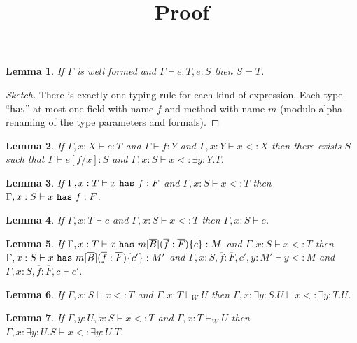\documentclass[preprint,nocopyrightspace,9pt]{sigplanconf}
\begin{document}
\title{Proof}
\authorinfo{}{}{}
\maketitle

\newtheorem{thm}{Theorem}
\newtheorem{lem}{Lemma}

\begin{lem}\label{uni}
If $\Gamma$ is well formed and $\Gamma\vdash e:T,e:S$ then $S=T$.
\end{lem}

\begin{proof}[Sketch]
There is exactly one typing rule for each kind of expression. Each type ``{\tt has}'' at most one field with name $f$ and method with name $m$ (modulo alpha-renaming of the type parameters and formals).
\end{proof}

\begin{lem}\label{sub}
If $\Gamma,x:X\vdash e:T$ and $\Gamma\vdash f:Y$ and $\Gamma,x:Y\vdash x<:X$ then there exists $S$ such that $\Gamma\vdash e[f/x]:S$ and $\Gamma,x:S\vdash x<:\exists y:Y.T$.
\end{lem}

\begin{lem}\label{suf}
If $\Gamma,x:T\vdash x~{\tt has}~f:F$ and $\Gamma,x:S\vdash x<:T$ then $\Gamma,x:S\vdash x~{\tt has}~f:F$.
\end{lem}

\begin{lem}\label{suc}
If $\Gamma,x:T\vdash c$ and $\Gamma,x:S\vdash x<:T$ then $\Gamma,x:S\vdash c$.
\end{lem}

\begin{lem}\label{sum}
If $\Gamma,x:T\vdash x~{\tt has}~m[\overline{B}](\overline{f}:\overline{F})\{c\}:M$ and $\Gamma,x:S\vdash x<:T$ then $\Gamma,x:S\vdash x~{\tt has}~m[\overline{B}](\overline{f}:\overline{F})\{c'\}:M'$ and $\Gamma,x:S,\overline{f}:\overline{F},c',y:M'\vdash y<:M$ and $\Gamma,x:S,\overline{f}:\overline{F},c\vdash c'$.
\end{lem}

\begin{lem}\label{sue}
If $\Gamma,x:S\vdash x<:T$ and $\Gamma,x:T\vdash_W U$ then $\Gamma, x:\exists y:S.U\vdash x<:\exists y:T.U$.
\end{lem}

\begin{lem}\label{sud}
If $\Gamma,y:U,x:S\vdash x<:T$ and $\Gamma,x:T\vdash_W U$ then $\Gamma, x:\exists y:U.S\vdash x<:\exists y:U.T$.
\end{lem}
\end{document}
